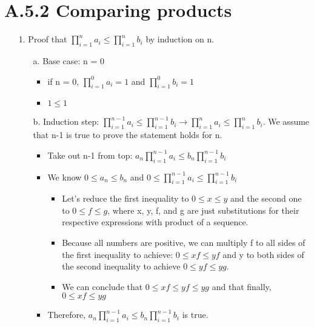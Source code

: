\documentclass[12pt]{article}
\begin{document}
\section*{A.5.2 Comparing products}
\begin{enumerate}
  \item[1.] Proof that ${\prod_{i=1}^{n} a_i \leq \prod_{i=1}^{n} b_i}$ by induction on n.
    \begin{enumerate}
      \item[a.] Base case: n = 0
        \begin{itemize}
          \item if n = 0, ${\prod_{i=1}^{0} a_i = 1}$ and ${\prod_{i=1}^{0} b_i = 1}$
          \item ${1 \leq 1}$
        \end{itemize}
      \item[b.] Induction step: ${\prod_{i=1}^{n-1} a_i \leq \prod_{i=1}^{n-1} b_i \rightarrow \prod_{i=1}^{n} a_i \leq \prod_{i=1}^{n} b_i}$. We assume that n-1 is true to prove the statement holds for n.
        \begin{itemize}
          \item Take out n-1 from top: ${a_n\prod_{i=1}^{n-1} a_i \leq b_n\prod_{i=1}^{n-1} b_i}$
          \item We know ${0 \leq a_n \leq b_n}$ and ${0 \leq \prod_{i=1}^{n-1} a_i \leq \prod_{i=1}^{n-1} b_i}$ 
            \begin{itemize} 
              \item Let's reduce the first inequality to ${0 \leq x \leq y}$ and the second one to ${0 \leq f \leq g}$, where x, y, f, and g are just substitutions for their respective expressions with product of a sequence.
              \item Because all numbers are positive, we can multiply f to all sides of the first inequality to achieve: ${0 \leq xf \leq yf}$ and y to both sides of the second inequality to achieve ${0 \leq yf \leq yg}$.
              \item We can conclude that ${0 \leq xf \leq yf \leq yg}$ and that finally, ${0 \leq xf \leq yg}$
            \end{itemize}
          \item Therefore, ${a_n\prod_{i=1}^{n-1} a_i \leq b_n\prod_{i=1}^{n-1} b_i}$ is true.
        \end{itemize}
    \end{enumerate}
                

\end{enumerate}
\end{document}
